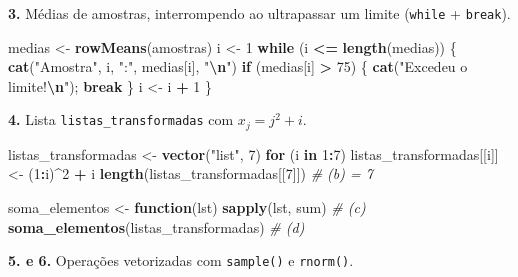 \documentclass[
  portuguese,
  11pt,
  openany]{book}
\newenvironment{Shaded}{\begin{snugshade}}{\end{snugshade}}
\newcommand{\CommentTok}[1]{\textcolor[rgb]{0.56,0.35,0.01}{\textit{#1}}}
\newcommand{\ControlFlowTok}[1]{\textcolor[rgb]{0.13,0.29,0.53}{\textbf{#1}}}
\newcommand{\DecValTok}[1]{\textcolor[rgb]{0.00,0.00,0.81}{#1}}
\newcommand{\FunctionTok}[1]{\textcolor[rgb]{0.13,0.29,0.53}{\textbf{#1}}}
\newcommand{\NormalTok}[1]{#1}
\newcommand{\OtherTok}[1]{\textcolor[rgb]{0.56,0.35,0.01}{#1}}
\newcommand{\SpecialCharTok}[1]{\textcolor[rgb]{0.81,0.36,0.00}{\textbf{#1}}}
\newcommand{\StringTok}[1]{\textcolor[rgb]{0.31,0.60,0.02}{#1}}
\begin{document}
\textbf{3.} Médias de amostras, interrompendo ao ultrapassar um limite (\texttt{while} + \texttt{break}).

\begin{Shaded}
\begin{Highlighting}[]
\NormalTok{medias }\OtherTok{\textless{}{-}} \FunctionTok{rowMeans}\NormalTok{(amostras)}
\NormalTok{i }\OtherTok{\textless{}{-}} \DecValTok{1}
\ControlFlowTok{while}\NormalTok{ (i }\SpecialCharTok{\textless{}=} \FunctionTok{length}\NormalTok{(medias)) \{}
  \FunctionTok{cat}\NormalTok{(}\StringTok{"Amostra"}\NormalTok{, i, }\StringTok{":"}\NormalTok{, medias[i], }\StringTok{"}\SpecialCharTok{\textbackslash{}n}\StringTok{"}\NormalTok{)}
  \ControlFlowTok{if}\NormalTok{ (medias[i] }\SpecialCharTok{\textgreater{}} \DecValTok{75}\NormalTok{) \{ }\FunctionTok{cat}\NormalTok{(}\StringTok{"Excedeu o limite!}\SpecialCharTok{\textbackslash{}n}\StringTok{"}\NormalTok{); }\ControlFlowTok{break}\NormalTok{ \}}
\NormalTok{  i }\OtherTok{\textless{}{-}}\NormalTok{ i }\SpecialCharTok{+} \DecValTok{1}
\NormalTok{\}}
\end{Highlighting}
\end{Shaded}

\textbf{4.} Lista \texttt{listas\_transformadas} com \(x_j = j^2 + i\).

\begin{Shaded}
\begin{Highlighting}[]
\NormalTok{listas\_transformadas }\OtherTok{\textless{}{-}} \FunctionTok{vector}\NormalTok{(}\StringTok{"list"}\NormalTok{, }\DecValTok{7}\NormalTok{)}
\ControlFlowTok{for}\NormalTok{ (i }\ControlFlowTok{in} \DecValTok{1}\SpecialCharTok{:}\DecValTok{7}\NormalTok{) listas\_transformadas[[i]] }\OtherTok{\textless{}{-}}\NormalTok{ (}\DecValTok{1}\SpecialCharTok{:}\NormalTok{i)}\SpecialCharTok{\^{}}\DecValTok{2} \SpecialCharTok{+}\NormalTok{ i}
\FunctionTok{length}\NormalTok{(listas\_transformadas[[}\DecValTok{7}\NormalTok{]])                  }\CommentTok{\# (b) = 7}

\NormalTok{soma\_elementos }\OtherTok{\textless{}{-}} \ControlFlowTok{function}\NormalTok{(lst) }\FunctionTok{sapply}\NormalTok{(lst, sum)   }\CommentTok{\# (c)}
\FunctionTok{soma\_elementos}\NormalTok{(listas\_transformadas)               }\CommentTok{\# (d)}
\end{Highlighting}
\end{Shaded}

\textbf{5. e 6.} Operações vetorizadas com \texttt{sample()} e \texttt{rnorm()}.
\end{document}
